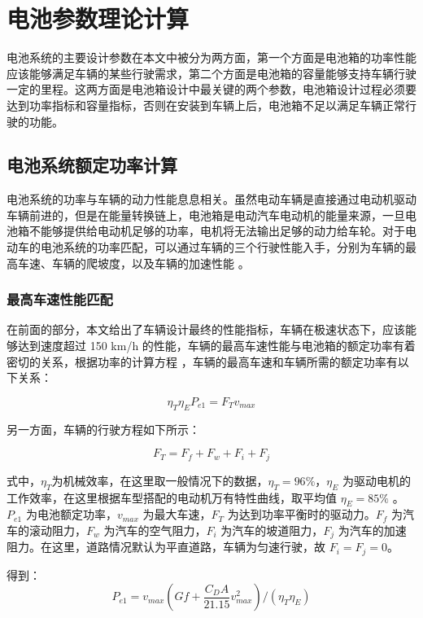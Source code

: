 \section{电池参数理论计算}
电池系统的主要设计参数在本文中被分为两方面，第一个方面是电池箱的功率性能应该能够满足车辆的某些行驶需求，第二个方面是电池箱的容量能够支持车辆行驶一定的里程。这两方面是电池箱设计中最关键的两个参数，电池箱设计过程必须要达到功率指标和容量指标，否则在安装到车辆上后，电池箱不足以满足车辆正常行驶的功能。

\subsection{电池系统额定功率计算}
电池系统的功率与车辆的动力性能息息相关。虽然电动车辆是直接通过电动机驱动车辆前进的，但是在能量转换链上，电池箱是电动汽车电动机的能量来源，一旦电池箱不能够提供给电动机足够的功率，电机将无法输出足够的动力给车轮。对于电动车的电池系统的功率匹配，可以通过车辆的三个行驶性能入手，分别为车辆的最高车速、车辆的爬坡度，以及车辆的加速性能 \cite{phev-zongshu}。

\subsubsection{最高车速性能匹配}
在前面的部分，本文给出了车辆设计最终的性能指标，车辆在极速状态下，应该能够达到速度超过 150 km/h 的性能，车辆的最高车速性能与电池箱的额定功率有着密切的关系，根据功率的计算方程 \cite{刘昭度2012汽车学}，车辆的最高车速和车辆所需的额定功率有以下关系：

\begin{equation}
\eta_T\eta_EP_{e1} = F_T v_{max}
\end{equation}

另一方面，车辆的行驶方程如下所示：

\begin{equation}
	\label{equ:powerequ}
F_T = F_f+F_w+F_i+F_j	
\end{equation}

式中，$\eta_T$为机械效率，在这里取一般情况下的数据，$\eta_T = 96\%$，$\eta_E$ 为驱动电机的工作效率，在这里根据车型搭配的电动机万有特性曲线，取平均值 $\eta_E = 85\%$ 。$P_{e1}$ 为电池额定功率，$v_{max}$ 为最大车速，$F_T$ 为达到功率平衡时的驱动力。$F_f$ 为汽车的滚动阻力，$F_w$ 为汽车的空气阻力，$F_i$ 为汽车的坡道阻力，$F_j$ 为汽车的加速阻力。在这里，道路情况默认为平直道路，车辆为匀速行驶，故 $F_i = F_j = 0$。

得到：
\begin{equation}
\label{equ:zuli}
P_{e1} = v_{max} (Gf+\frac{C_DA}{21.15}v_{max}^2)/(\eta_T\eta_E)
\end{equation}

